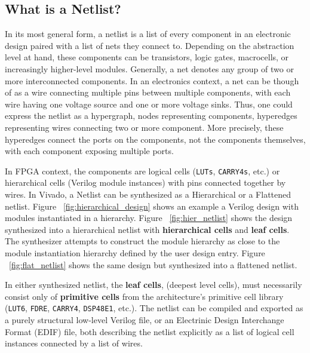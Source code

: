 \subsection{What is a Netlist?}
\label{subsec:netlist}
In its most general form, a netlist is a list of every component in an electronic design paired with a list of nets they connect to. 
Depending on the abstraction level at hand, these components can be transistors, logic gates, macrocells, or increasingly higher-level modules. 
Generally, a net denotes any group of two or more interconnected components.
In an electronics context, a net can be though of as a wire connecting multiple pins between multiple components, with each wire having one voltage source and one or more voltage sinks. 
Thus, one could express the netlist as a hypergraph, nodes representing components, hyperedges representing wires connecting two or more component. 
More precisely, these hyperedges connect the ports on the components, not the components themselves, with each component exposing multiple ports. 

In FPGA context, the components are logical cells (\texttt{LUTs}, \texttt{CARRY4s}, etc.) or hierarchical cells (Verilog module instances) with pins connected together by wires. 
In Vivado, a Netlist can be synthesized as a Hierarchical or a Flattened netlist. 
Figure ~\ref{fig:hierarchical_design} shows an example a Verilog design with modules instantiated in a hierarchy. 
Figure ~\ref{fig:hier_netlist} shows the design synthesized into a hierarchical netlist with \textbf{hierarchical cells} and \textbf{leaf cells}. 
The synthesizer attempts to construct the module hierarchy as close to the module instantiation hierarchy defined by the user design entry. 
Figure ~\ref{fig:flat_netlist} shows the same design but synthesized into a flattened netlist. 

In either synthesized netlist, the \textbf{leaf cells}, (deepest level cells), must necessarily consist only of \textbf{primitive cells} from the architecture's primitive cell library (\texttt{LUT6}, \texttt{FDRE}, \texttt{CARRY4}, \texttt{DSP48E1}, etc.). 
The netlist can be compiled and exported as a purely structural low-level Verilog file, or an Electrinic Design Interchange Format (EDIF) file, both describing the netlist explicitly as a list of logical cell instances connected by a list of wires. 

